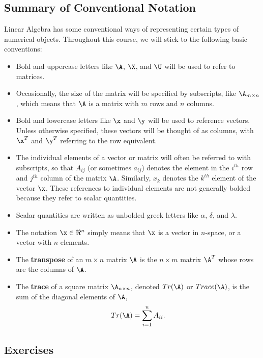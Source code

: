 \documentclass[
]{article}
\providecommand{\tightlist}{%
  \setlength{\itemsep}{0pt}\setlength{\parskip}{0pt}}
\theoremstyle{definition}
\theoremstyle{definition}
\theoremstyle{definition}
\theoremstyle{definition}
\theoremstyle{remark}
\begin{document}
\hypertarget{summary-of-conventional-notation}{%
\subsection{Summary of Conventional Notation}\label{summary-of-conventional-notation}}

Linear Algebra has some conventional ways of representing certain types of numerical objects. Throughout this course, we will stick to the following basic conventions:

\begin{itemize}
\tightlist
\item
  Bold and uppercase letters like \(\A\), \(\X\), and \(\U\) will be used to refer to matrices.
\item
  Occasionally, the size of the matrix will be specified by subscripts, like \(\A_{m\times n}\), which means that \(\A\) is a matrix with \(m\) rows and \(n\) columns.
\item
  Bold and lowercase letters like \(\x\) and \(\y\) will be used to reference vectors. Unless otherwise specified, these vectors will be thought of as columns, with \(\x^T\) and \(\y^T\) referring to the row equivalent.
\item
  The individual elements of a vector or matrix will often be referred to with subscripts, so that \(A_{ij}\) (or sometimes \(a_{ij}\)) denotes the element in the \(i^{th}\) row and \(j^{th}\) column of the matrix \(\A\). Similarly, \(x_k\) denotes the \(k^{th}\) element of the vector \(\x\). These references to individual elements are not generally bolded because they refer to scalar quantities.
\item
  Scalar quantities are written as unbolded greek letters like \(\alpha\), \(\delta\), and \(\lambda\).
\item
  The notation \(\x \in \Re^n\) simply means that \(\x\) is a vector in \(n\)-space, or a vector with \(n\) elements.
\item
  The \textbf{transpose} of an \(m\times n\) matrix \(\A\) is the \(n\times m\) matrix \(\A^T\) whose rows are the columns of \(\A\).
\item
  The \textbf{trace} of a square matrix \(\A_{n\times n}\), denoted \(Tr(\A)\) or \(Trace(\A)\), is the sum of the diagonal elements of \(\A\),
  \[Tr(\A)=\sum_{i=1}^n A_{ii}.\]
\end{itemize}

\hypertarget{exercises}{%
\subsection{Exercises}\label{exercises}}
\end{document}
